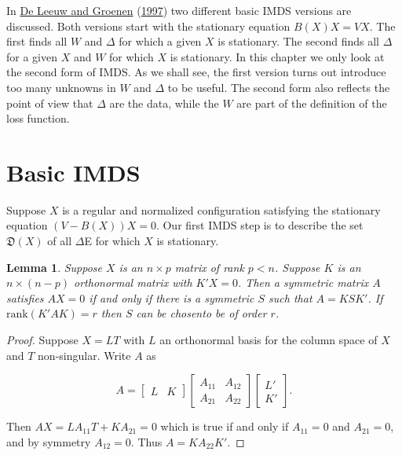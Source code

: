 \documentclass[
  12pt,
]{book}
\newtheorem{lemma}{Lemma}[chapter]
\theoremstyle{definition}
\theoremstyle{definition}
\theoremstyle{definition}
\theoremstyle{definition}
\theoremstyle{remark}
\begin{document}
In \protect\hyperlink{ref-deleeuw_groenen_A_97}{De Leeuw and Groenen} (\protect\hyperlink{ref-deleeuw_groenen_A_97}{1997}) two different basic IMDS versions are discussed. Both versions start with the stationary equation \(B(X)X=VX\). The first finds all \(W\) and \(\Delta\) for which a given \(X\) is stationary. The second finds all \(\Delta\) for a given \(X\) and \(W\) for which \(X\) is stationary. In this chapter we only look at the second form of IMDS. As we shall see, the first version turns out introduce too many unknowns in \(W\) and \(\Delta\) to be useful. The second form also reflects the point of view that \(\Delta\) are the data, while the \(W\) are part of the definition of the loss function.

\hypertarget{basic-imds}{%
\section{Basic IMDS}\label{basic-imds}}

Suppose \(X\) is a regular and normalized configuration satisfying the stationary equation \((V-B(X))X=0\).
Our first IMDS step is to describe the set \(\mathfrak{D}(X)\) of all \(\Delta\)E for which \(X\) is stationary.

\begin{lemma}
\protect\hypertarget{lem:syminv}{}\label{lem:syminv}Suppose \(X\) is an \(n\times p\) matrix of rank \(p<n\). Suppose \(K\) is an \(n\times(n-p)\) orthonormal matrix with \(K'X=0\). Then a symmetric matrix \(A\) satisfies \(AX=0\) if and only if there is a symmetric \(S\) such that \(A=KSK'\). If \(\text{rank}(K'AK)=r\) then \(S\) can be chosento be of order \(r\).
\end{lemma}

\begin{proof}
Suppose \(X=LT\) with \(L\) an orthonormal basis for the column space of \(X\) and \(T\) non-singular. Write \(A\) as

\begin{equation}
A=\begin{bmatrix}L&K\end{bmatrix}
\begin{bmatrix}
A_{11}&A_{12}\\A_{21}&A_{22}
\end{bmatrix}
\begin{bmatrix}L'\\K'\end{bmatrix}.
\label{eq:invasolve}
\end{equation}

Then \(AX=LA_{11}T+KA_{21}=0\) which is true if and only if \(A_{11}=0\)
and \(A_{21}=0\), and by symmetry \(A_{12}=0\). Thus \(A=KA_{22}K'\).
\end{proof}
\end{document}

